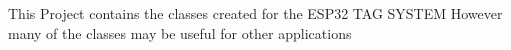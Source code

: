 This Project contains the classes created for the E\+S\+P32 T\+AG S\+Y\+S\+T\+EM However many of the classes may be useful for other applications 